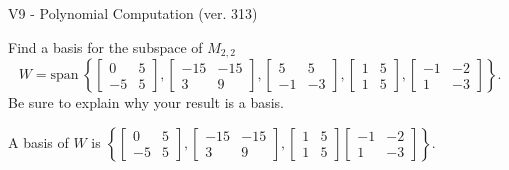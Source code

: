 \begin{exercise}
  \begin{exerciseTitle}V9 - Polynomial Computation (ver. 313)\end{exerciseTitle}
  \begin{exerciseStatement}
    Find a basis for the subspace of \(M_{2,2}\) 
\[W=\mathrm{span}\ \left\{\left[\begin{array}{cc}
0 & 5 \\
-5 & 5
\end{array}\right] , \left[\begin{array}{cc}
-15 & -15 \\
3 & 9
\end{array}\right] , \left[\begin{array}{cc}
5 & 5 \\
-1 & -3
\end{array}\right] , \left[\begin{array}{cc}
1 & 5 \\
1 & 5
\end{array}\right] , \left[\begin{array}{cc}
-1 & -2 \\
1 & -3
\end{array}\right]\right\}.\]
 Be sure to explain why your result is a basis.


  \end{exerciseStatement}
  \begin{exerciseAnswer}
   A basis of \(W\) is  \(\left\{\left[\begin{array}{cc}
0 & 5 \\
-5 & 5
\end{array}\right] , \left[\begin{array}{cc}
-15 & -15 \\
3 & 9
\end{array}\right] , \left[\begin{array}{cc}
1 & 5 \\
1 & 5
\end{array}\right] \left[\begin{array}{cc}
-1 & -2 \\
1 & -3
\end{array}\right]\right\}\).
  


  \end{exerciseAnswer}
\end{exercise}
